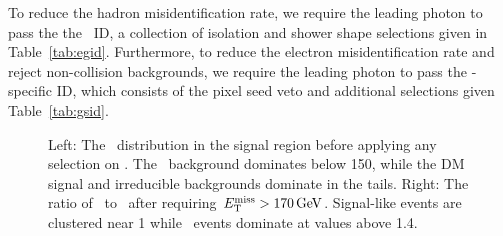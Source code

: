 To reduce the hadron misidentification rate, we require the leading photon to pass the the \egamma\ ID, a collection of isolation and shower shape selections given in Table~\ref{tab:egid}.
Furthermore, to reduce the electron misidentification rate and reject non-collision backgrounds, we require the leading photon to pass the \Pgg-specific ID, which consists of the pixel seed veto and additional selections given Table~\ref{tab:gsid}.

\begin{figure}[htbp]
  \centering
  \caption{
    Left: The \met\ distribution in the signal region before applying any selection on \met. 
    The \gj\ background dominates below 150\GeV, while the DM signal and irreducible backgrounds dominate in the tails.
    Right: The ratio of \ETg\ to \met\ after requiring $E_{\mathrm{T}}^{\text{miss}} > 170\,\text{Ge\hspace{-.08em}V}$.
    Signal-like events are clustered near 1 while \gj\ events dominate at values above 1.4.  
  }
  \label{fig:metcuts}
\end{figure}

